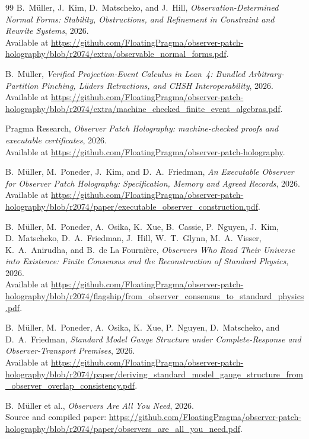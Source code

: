 \documentclass[11pt]{article}
\theoremstyle{remark}
\theoremstyle{plain}
\begin{document}
\begin{thebibliography}{99}
B.~M\"uller, J.~Kim, D.~Matscheko, and J.~Hill,
\emph{Observation-Determined Normal Forms: Stability, Obstructions, and Refinement in Constraint
and Rewrite Systems},
2026.\\
Available at \url{https://github.com/FloatingPragma/observer-patch-holography/blob/r2074/extra/observable_normal_forms.pdf}.

B.~M\"uller,
\emph{Verified Projection-Event Calculus in Lean~4: Bundled Arbitrary-Partition Pinching,
L\"uders Retractions, and CHSH Interoperability},
2026.\\
Available at \url{https://github.com/FloatingPragma/observer-patch-holography/blob/r2074/extra/machine_checked_finite_event_algebras.pdf}.

Pragma Research,
\emph{Observer Patch Holography: machine-checked proofs and executable certificates},
2026.\\
Available at \url{https://github.com/FloatingPragma/observer-patch-holography}.

B.~M\"uller, M.~Poneder, J.~Kim, and D.~A.~Friedman,
\emph{An Executable Observer for Observer Patch Holography: Specification, Memory and Agreed Records},
2026.\\
Available at \url{https://github.com/FloatingPragma/observer-patch-holography/blob/r2074/paper/executable_observer_construction.pdf}.

B.~M\"uller, M.~Poneder, A.~Osika, K.~Xue, B.~Cassie, P.~Nguyen, J.~Kim, D.~Matscheko, D.~A.~Friedman, J.~Hill, W.~T.~Glynn, M.~A.~Visser, K.~A.~Anirudha, and B.~de La Fourni\`ere,
\emph{Observers Who Read Their Universe into Existence: Finite Consensus and the Reconstruction of Standard Physics},
2026.\\
Available at \url{https://github.com/FloatingPragma/observer-patch-holography/blob/r2074/flagship/from_observer_consensus_to_standard_physics.pdf}.

B.~M\"uller, M.~Poneder, A.~Osika, K.~Xue, P.~Nguyen, D.~Matscheko, and D.~A.~Friedman,
\emph{Standard Model Gauge Structure under Complete-Response and Observer-Transport Premises},
2026.\\
Available at \url{https://github.com/FloatingPragma/observer-patch-holography/blob/r2074/paper/deriving_standard_model_gauge_structure_from_observer_overlap_consistency.pdf}.

B.~M\"uller et al.,
\emph{Observers Are All You Need},
2026.\\
Source and compiled paper:
\url{https://github.com/FloatingPragma/observer-patch-holography/blob/r2074/paper/observers_are_all_you_need.pdf}.


\end{thebibliography}
\end{document}
